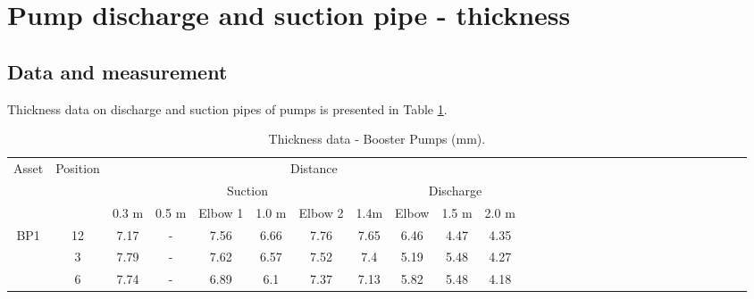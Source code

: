 %
\section{Pump discharge and suction pipe - thickness} \label{ch04mech01}
\subsection{Data and measurement}
Thickness data on discharge and suction pipes of pumps is presented in Table \ref{ch04_tbl_thickness02}.
\begin{table}[h]
	\caption{Thickness data - Booster Pumps (mm).}
	\label{ch04_tbl_thickness02}
	{\footnotesize

\begin{tabular}{l|l|l|l|l|l|l|l|l|l|lllllllllllllllllll}
\cline{1-11}
\multicolumn{1}{c|}{Asset} & \multicolumn{1}{c|}{Position} & \multicolumn{9}{c}{Distance} &  &  &  &  &  &  &  &  &  &  &  &  &  &  &  &  &  &  \\ 
\cline{3-11}
\multicolumn{1}{c|}{} & \multicolumn{1}{c|}{} & \multicolumn{6}{c|}{Suction} & \multicolumn{3}{c}{Discharge} &  &  &  &  &  &  &  &  &  &  &  &  &  &  &  &  &  &  \\ 
\cline{3-11}
\multicolumn{1}{c|}{} & \multicolumn{1}{c|}{} & 0.3 m    & 0.5 m    & \multicolumn{1}{c|}{Elbow 1} & 1.0 m    & \multicolumn{1}{c|}{Elbow 2} & \multicolumn{1}{c|}{1.4m} & \multicolumn{1}{c|}{Elbow} & \multicolumn{1}{c|}{1.5 m   } & \multicolumn{1}{c}{2.0 m   } &  &  &  &  &  &  &  &  &  &  &  &  &  &  &  &  &  &  \\ 
\cline{1-11}
\multicolumn{1}{c|}{BP1} & \multicolumn{1}{c|}{12} & \multicolumn{1}{c|}{7.17} & \multicolumn{1}{c|}{-} & \multicolumn{1}{c|}{7.56} & \multicolumn{1}{c|}{6.66} & \multicolumn{1}{c|}{7.76} & \multicolumn{1}{c|}{7.65} & \multicolumn{1}{c|}{6.46} & \multicolumn{1}{c|}{4.47} & \multicolumn{1}{c}{4.35} &  &  &  &  &  &  &  &  &  &  &  &  &  &  &  &  &  &  \\ 
\multicolumn{1}{c|}{} & \multicolumn{1}{c|}{3} & \multicolumn{1}{c|}{7.79} & \multicolumn{1}{c|}{-} & \multicolumn{1}{c|}{7.62} & \multicolumn{1}{c|}{6.57} & \multicolumn{1}{c|}{7.52} & \multicolumn{1}{c|}{7.4} & \multicolumn{1}{c|}{5.19} & \multicolumn{1}{c|}{5.48} & \multicolumn{1}{c}{4.27} &  &  &  &  &  &  &  &  &  &  &  &  &  &  &  &  &  &  \\ 
\multicolumn{1}{c|}{} & \multicolumn{1}{c|}{6} & \multicolumn{1}{c|}{7.74} & \multicolumn{1}{c|}{-} & \multicolumn{1}{c|}{6.89} & \multicolumn{1}{c|}{6.1} & \multicolumn{1}{c|}{7.37} & \multicolumn{1}{c|}{7.13} & \multicolumn{1}{c|}{5.82} & \multicolumn{1}{c|}{5.48} & \multicolumn{1}{c}{4.18} &  &  &  &  &  &  &  &  &  &  &  &  &  &  &  &  &  &  \\ 

\end{tabular}}
\end{table}
